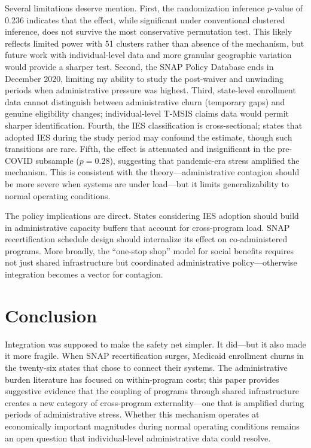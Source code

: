\documentclass[12pt]{article}
\begin{document}
Several limitations deserve mention. First, the randomization inference $p$-value of 0.236 indicates that the effect, while significant under conventional clustered inference, does not survive the most conservative permutation test. This likely reflects limited power with 51 clusters rather than absence of the mechanism, but future work with individual-level data and more granular geographic variation would provide a sharper test. Second, the SNAP Policy Database ends in December 2020, limiting my ability to study the post-waiver and unwinding periods when administrative pressure was highest. Third, state-level enrollment data cannot distinguish between administrative churn (temporary gaps) and genuine eligibility changes; individual-level T-MSIS claims data would permit sharper identification. Fourth, the IES classification is cross-sectional; states that adopted IES during the study period may confound the estimate, though such transitions are rare. Fifth, the effect is attenuated and insignificant in the pre-COVID subsample ($p = 0.28$), suggesting that pandemic-era stress amplified the mechanism. This is consistent with the theory---administrative contagion should be more severe when systems are under load---but it limits generalizability to normal operating conditions.

The policy implications are direct. States considering IES adoption should build in administrative capacity buffers that account for cross-program load. SNAP recertification schedule design should internalize its effect on co-administered programs. More broadly, the ``one-stop shop'' model for social benefits requires not just shared infrastructure but coordinated administrative policy---otherwise integration becomes a vector for contagion.


\section{Conclusion}

Integration was supposed to make the safety net simpler. It did---but it also made it more fragile. When SNAP recertification surges, Medicaid enrollment churns in the twenty-six states that chose to connect their systems. The administrative burden literature has focused on within-program costs; this paper provides suggestive evidence that the coupling of programs through shared infrastructure creates a new category of cross-program externality---one that is amplified during periods of administrative stress. Whether this mechanism operates at economically important magnitudes during normal operating conditions remains an open question that individual-level administrative data could resolve.
\end{document}
